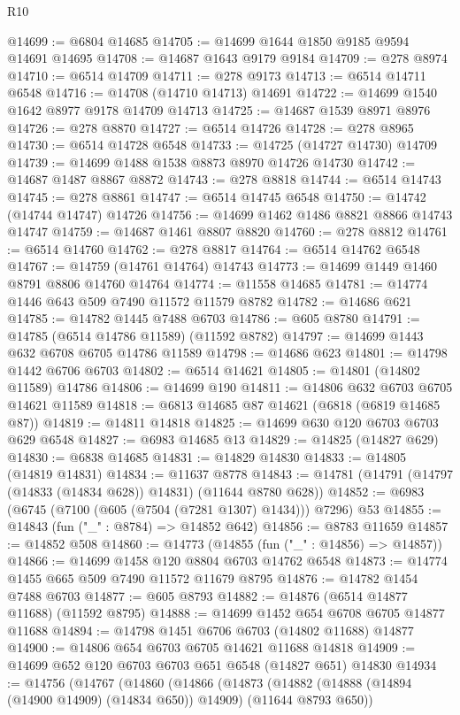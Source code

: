 \begin{lexlean}{R10}
\begin{coremodule}
{{{{{{{{{{{{{{{{{{{{{{{{{{{{{{{{{{{{{{{{{{{{{{{{{{{{{{{{{{{{{{{{{{{{{{{{{{{{{{{{{{{{@14699 := @6804 @14685
@14705 := @14699 @1644 @1850 @9185 @9594 @14691 @14695
@14708 := @14687 @1643 @9179 @9184
@14709 := @278 @8974
@14710 := @6514 @14709
@14711 := @278 @9173
@14713 := @6514 @14711 @6548
@14716 := @14708 (@14710 @14713) @14691
@14722 := @14699 @1540 @1642 @8977 @9178 @14709 @14713
@14725 := @14687 @1539 @8971 @8976
@14726 := @278 @8870
@14727 := @6514 @14726
@14728 := @278 @8965
@14730 := @6514 @14728 @6548
@14733 := @14725 (@14727 @14730) @14709
@14739 := @14699 @1488 @1538 @8873 @8970 @14726 @14730
@14742 := @14687 @1487 @8867 @8872
@14743 := @278 @8818
@14744 := @6514 @14743
@14745 := @278 @8861
@14747 := @6514 @14745 @6548
@14750 := @14742 (@14744 @14747) @14726
@14756 := @14699 @1462 @1486 @8821 @8866 @14743 @14747
@14759 := @14687 @1461 @8807 @8820
@14760 := @278 @8812
@14761 := @6514 @14760
@14762 := @278 @8817
@14764 := @6514 @14762 @6548
@14767 := @14759 (@14761 @14764) @14743
@14773 := @14699 @1449 @1460 @8791 @8806 @14760 @14764
@14774 := @11558 @14685
@14781 := @14774 @1446 @643 @509 @7490 @11572 @11579 @8782
@14782 := @14686 @621
@14785 := @14782 @1445 @7488 @6703
@14786 := @605 @8780
@14791 := @14785 (@6514 @14786 @11589) (@11592 @8782)
@14797 := @14699 @1443 @632 @6708 @6705 @14786 @11589
@14798 := @14686 @623
@14801 := @14798 @1442 @6706 @6703
@14802 := @6514 @14621
@14805 := @14801 (@14802 @11589) @14786
@14806 := @14699 @190
@14811 := @14806 @632 @6703 @6705 @14621 @11589
@14818 := @6813 @14685 @87 @14621 (@6818 (@6819 @14685 @87))
@14819 := @14811 @14818
@14825 := @14699 @630 @120 @6703 @6703 @629 @6548
@14827 := @6983 @14685 @13
@14829 := @14825 (@14827 @629)
@14830 := @6838 @14685
@14831 := @14829 @14830
@14833 := @14805 (@14819 @14831)
@14834 := @11637 @8778
@14843 := @14781 (@14791 (@14797 (@14833 (@14834 @628)) @14831) (@11644 @8780 @628))
@14852 := @6983 (@6745 (@7100 (@605 (@7504 (@7281 @1307) @1434))) @7296) @53
@14855 := @14843 (fun ("_" : @8784) => @14852 @642)
@14856 := @8783 @11659
@14857 := @14852 @508
@14860 := @14773 (@14855 (fun ("_" : @14856) => @14857))
@14866 := @14699 @1458 @120 @8804 @6703 @14762 @6548
@14873 := @14774 @1455 @665 @509 @7490 @11572 @11679 @8795
@14876 := @14782 @1454 @7488 @6703
@14877 := @605 @8793
@14882 := @14876 (@6514 @14877 @11688) (@11592 @8795)
@14888 := @14699 @1452 @654 @6708 @6705 @14877 @11688
@14894 := @14798 @1451 @6706 @6703 (@14802 @11688) @14877
@14900 := @14806 @654 @6703 @6705 @14621 @11688 @14818
@14909 := @14699 @652 @120 @6703 @6703 @651 @6548 (@14827 @651) @14830
@14934 := @14756
    (@14767
      (@14860
        (@14866
          (@14873
            (@14882 (@14888 (@14894 (@14900 @14909) (@14834 @650)) @14909) (@11644 @8793 @650))
}}}}}}}}}}}}}}}}}}}}}}}}}}}}}}}}}}}}}}}}}}}}}}}}}}}}}}}}}}}}}}}}}}}}}}}}}}}}}}}}}}}}
\end{coremodule}
\end{lexlean}
